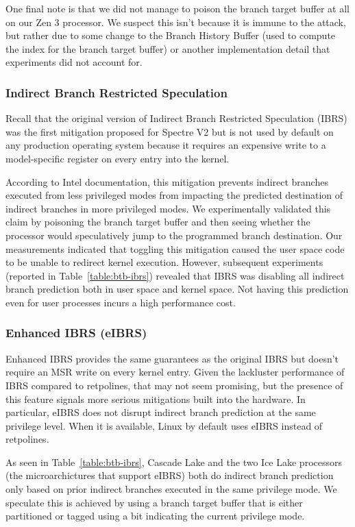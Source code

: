 One final note is that we did not manage to poison the branch target buffer at all on our Zen 3 processor.
We suspect this isn't because it is immune to the attack, but rather due to some change to the Branch History Buffer (used to compute the index for the branch target buffer) or another implementation detail that experiments did not account for.

\subsubsection{Indirect Branch Restricted Speculation}

Recall that the original version of Indirect Branch Restricted Speculation (IBRS) was the first mitigation proposed for Spectre V2 but is not used by default on any production operating system because it requires an expensive write to a model-specific register on every entry into the kernel.

According to Intel documentation, this mitigation prevents indirect branches executed from less privileged modes from impacting the predicted destination of indirect branches in more privileged modes.
We experimentally validated this claim by poisoning the branch target buffer and then seeing whether the processor would speculatively jump to the programmed branch destination.
Our measurements indicated that toggling this mitigation caused the
user space code to be unable to redirect kernel execution.
However, subsequent experiments (reported in
Table~\ref{table:btb-ibrs}) revealed that IBRS was disabling all
indirect branch prediction both in user space and kernel space.
Not having this prediction even for user processes incurs a high performance cost.

\subsubsection{Enhanced IBRS (eIBRS)}

Enhanced IBRS provides the same guarantees as the original IBRS but doesn't require an MSR write on every kernel entry.
Given the lackluster performance of IBRS compared to retpolines, that may not seem promising, but the presence of this feature signals more serious mitigations built into the hardware.
In particular, eIBRS does not disrupt indirect branch prediction at the same privilege level.
When it is available, Linux by default uses eIBRS instead of retpolines.

As seen in Table~\ref{table:btb-ibrs}, Cascade Lake and the two Ice Lake
processors (the microarchictures that support eIBRS) both do indirect branch prediction only based on prior indirect branches executed in the same privilege mode.
We speculate this is achieved by using a branch target buffer that is either partitioned or tagged using a bit indicating the current privilege mode.

